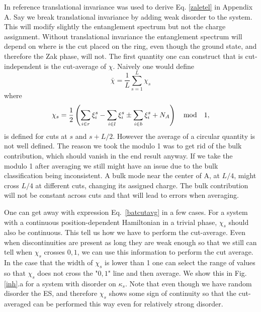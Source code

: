 \documentclass[twocolumn,amsmath,longbibliography,amssymb,superscriptaddress]{revtex4-1}
\begin{document}
In reference \cite{Zaletel2014} translational invariance was used to derive Eq. \ref{zaletel} in Appendix A. Say we break translational invariance by adding weak disorder to the system. This will modify slightly the entanglement spectrum but not the charge assignment. Without translational invariance the entanglement spectrum will depend on where is the cut placed on the ring, even though the ground state, and therefore the Zak phase, will not. The first quantity one can construct that is cut-independent is the cut-average of $\chi$. Naively one would define
\begin{equation}
\bar{\chi} = \frac{1}{L}\sum_{s=1}^L \chi_s
\label{batcutavg}
\end{equation}
where
\begin{equation}
\chi_s = \frac{1}{2} \left( \sum_{i\in r}\xi^s_i-\sum_{i\in l}\xi^s_i \pm \sum_{i\in b}\xi^s_i  + N_A \right) \quad {\rm mod} \quad 1,
\end{equation}
is defined for cuts at $s$ and $s+L/2$. However the average of a circular quantity is not well defined. The reason we took the modulo 1 was to get rid of the bulk contribution, which should vanish in the end result anyway. If we take the modulo 1 after averaging we still might have an issue due to the bulk classification being inconsistent. A bulk mode near the center of A, at $L/4$, might cross $L/4$ at different cuts, changing its assigned charge. The bulk contribution will not be constant across cuts and that will lead to errors when averaging. 

One can get away with expression Eq.~\eqref{batcutavg} in a few cases. For a system with a continuous position-dependent Hamiltonian in a trivial phase, $\chi_s$ should also be continuous. This tell us how we have to perform the cut-average. Even when discontinuities are present as long they are weak enough so that we still can tell when $\chi_s$ crosses $0,1$, we can use this information to perform the cut average. In the case that the width of $\chi_s$ is lower than 1 one can select the range of values so that $\chi_s$ does not cross the "$0,1$" line and then average. We show this in Fig.\ref{inh}.a for a system with disorder on $\kappa_s$. Note that even though we have random disorder the ES, and therefore $\chi_s$ shows some sign of continuity so that the cut-averaged can be performed this way even for relatively strong disorder.
\end{document}

